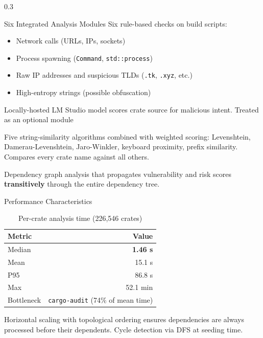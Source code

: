 \documentclass[final]{beamer}
\begin{document}
\begin{frame}[fragile]
\begin{columns}[t]
\begin{column}{0.3\paperwidth}
\begin{block}{Six Integrated Analysis Modules}
    \bigskip
    Six rule-based checks on build scripts:
    \begin{itemize}
        \item Network calls (URLs, IPs, sockets)
        \item Process spawning (\texttt{Command}, \texttt{std::process})
        \item Raw IP addresses and suspicious TLDs (\texttt{.tk}, \texttt{.xyz}, etc.)
        \item High-entropy strings (possible obfuscation)
    \end{itemize}

    \bigskip
    Locally-hosted LM Studio model scores crate source for
    malicious intent. Treated as an optional module

    \bigskip
    Five string-similarity algorithms combined with weighted scoring:
    Levenshtein, Damerau-Levenshtein, Jaro-Winkler, keyboard proximity,
    prefix similarity. Compares every crate name against all others.

    \bigskip
    Dependency graph analysis that propagates vulnerability and risk scores
    \textbf{transitively} through the entire dependency tree.
\end{block}

\begin{block}{Performance Characteristics}
    \begin{table}
    \centering
    \caption{Per-crate analysis time (226,546 crates)}
    \begin{tabular}{@{} lr @{}}
        \toprule
        Metric & Value \\
        \midrule
        Median & \textbf{1.46 s} \\
        Mean & 15.1 s \\
        P95 & 86.8 s \\
        Max & 52.1 min \\
        \midrule
        Bottleneck & \texttt{cargo-audit} (74\% of mean time) \\
        \bottomrule
    \end{tabular}
    \end{table}

    \bigskip
    Horizontal scaling with topological ordering ensures dependencies are always processed before their dependents.
    Cycle detection via DFS at seeding time.
\end{block}


\end{column}
\end{columns}
\end{frame}
\end{document}
